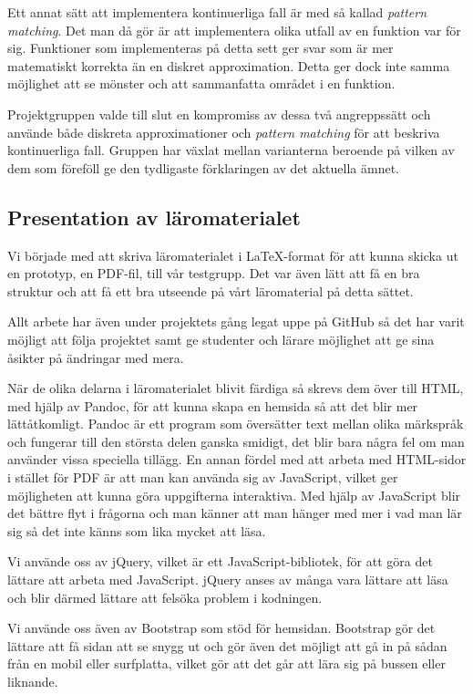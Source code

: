 \documentclass[]{article}
\begin{document}
Ett annat sätt att implementera kontinuerliga fall är med så kallad
\textit{pattern matching}. Det man då gör är att implementera olika
utfall av en funktion var för sig. Funktioner som implementeras på
detta sett ger svar som är mer matematiskt korrekta än en diskret
approximation. Detta ger dock inte samma möjlighet att se mönster och
att sammanfatta området i en funktion.

Projektgruppen valde till slut en kompromiss av dessa två angreppssätt
och använde både diskreta approximationer och \textit{pattern
 matching} för att beskriva kontinuerliga fall. Gruppen har växlat
mellan varianterna beroende på vilken av dem som föreföll ge den
tydligaste förklaringen av det aktuella ämnet.

\subsection{Presentation av läromaterialet}
Vi började med att skriva läromaterialet i LaTeX-format för att kunna
skicka ut en prototyp, en PDF-fil, till vår testgrupp. Det var även
lätt att få en bra struktur och att få ett bra utseende på vårt
läromaterial på detta sättet.

Allt arbete har även under projektets gång legat uppe på GitHub så det
har varit möjligt att följa projektet samt ge studenter och lärare
möjlighet att ge sina åsikter på ändringar med mera.

När de olika delarna i läromaterialet blivit färdiga så skrevs dem
över till HTML, med hjälp av Pandoc, för att kunna skapa en hemsida så
att det blir mer lätt\-åtkomligt. Pandoc är ett program som översätter
text mellan olika märkspråk och fungerar till den största delen ganska
smidigt, det blir bara några fel om man använder vissa speciella
tillägg. En annan fördel med att arbeta med HTML-sidor i stället för
PDF är att man kan använda sig av JavaScript, vilket ger möjligheten
att kunna göra uppgifterna interaktiva. Med hjälp av JavaScript blir
det bättre flyt i frågorna och man känner att man hänger med mer i vad
man lär sig så det inte känns som lika mycket att läsa.


Vi använde oss av jQuery, vilket är ett JavaScript-bibliotek, för att
göra det lättare att arbeta med JavaScript. jQuery anses av många vara
lättare att läsa och blir därmed lättare att felsöka problem i
kodningen.

Vi använde oss även av Bootstrap som stöd för hemsidan. Bootstrap gör
det lättare att få sidan att se snygg ut och gör även det möjligt att
gå in på sådan från en mobil eller surfplatta, vilket gör att det går
att lära sig på bussen eller liknande.
\end{document}
